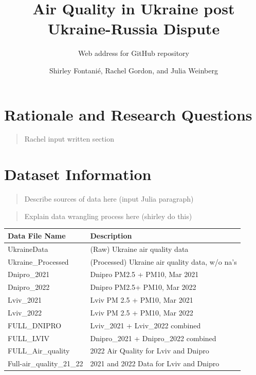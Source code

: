 \documentclass[
  12pt,
]{article}
\title{Air Quality in Ukraine post Ukraine-Russia Dispute}
\subtitle{Web address for GitHub repository}
\author{Shirley Fontanié, Rachel Gordon, and Julia Weinberg}
\date{}
\begin{document}
\maketitle

\newpage
\tableofcontents 
\newpage
\listoftables 
\newpage
\listoffigures 
\newpage

\hypertarget{rationale-and-research-questions}{%
\section{Rationale and Research
Questions}\label{rationale-and-research-questions}}

\begin{quote}
Rachel input written section
\end{quote}

\newpage

\hypertarget{dataset-information}{%
\section{Dataset Information}\label{dataset-information}}

\begin{quote}
Describe sources of data here (input Julia paragraph)
\end{quote}

\begin{quote}
Explain data wrangling process here (shirley do this)
\end{quote}

\begin{longtable}[]{@{}ll@{}}
\toprule
Data File Name & Description \\
\midrule
\endhead
UkraineData & (Raw) Ukraine air quality data \\
Ukraine\_Processed & (Processed) Ukraine air quality data, w/o na's \\
Dnipro\_2021 & Dnipro PM2.5 + PM10, Mar 2021 \\
Dnipro\_2022 & Dnipro PM2.5+ PM10, Mar 2022 \\
Lviv\_2021 & Lviv PM 2.5 + PM10, Mar 2021 \\
Lviv\_2022 & Lviv PM 2.5 + PM10, Mar 2022 \\
FULL\_DNIPRO & Lviv\_2021 + Lviv\_2022 combined \\
FULL\_LVIV & Dnipro\_2021 + Dnipro\_2022 combined \\
FULL\_Air\_quality & 2022 Air Quality for Lviv and Dnipro \\
Full-air\_quality\_21\_22 & 2021 and 2022 Data for Lviv and Dnipro \\
\bottomrule
\end{longtable}
\end{document}
